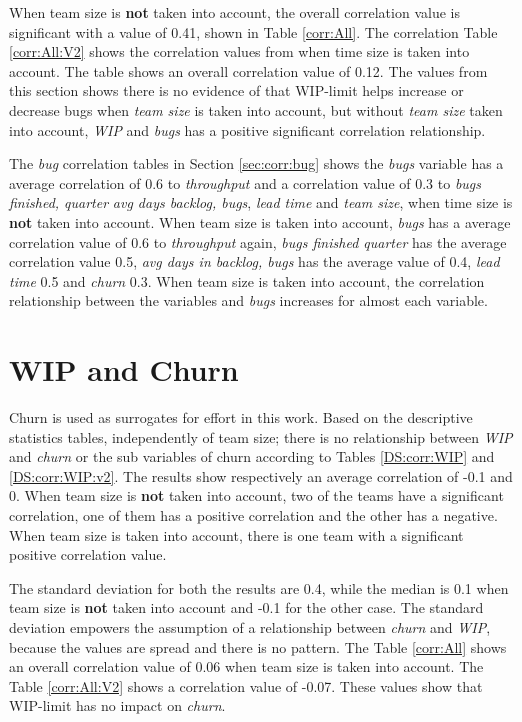 \documentclass[UKenglish]{ifimaster}  %
\begin{document}
When team size is \textbf{not} taken into account, the overall correlation value is significant with a value of  0.41, shown in Table \ref{corr:All}.  The correlation Table \ref{corr:All:V2} shows the correlation values from when time size is taken into account. The table shows an overall correlation value of 0.12. The values from this section shows there is no evidence of that WIP-limit helps increase or decrease bugs when \textit{team size} is taken into account, but without \textit{team size} taken into account, \textit{WIP} and \textit{bugs} has a positive significant correlation relationship.  


The \textit{bug} correlation tables in Section  \ref{sec:corr:bug} shows the \textit{bugs} variable has a average correlation of 0.6 to \textit{throughput} and a correlation value of 0.3 to \textit{bugs finished, quarter} \textit{avg days backlog, bugs}, \textit{lead time} and \textit{team size}, when time size is \textbf{not} taken into account. When team size is taken into account, \textit{bugs} has a average correlation value of 0.6 to \textit{throughput} again, \textit{bugs finished quarter} has the average correlation value 0.5, \textit{avg days in backlog, bugs} has the average value of 0.4, \textit{lead time} 0.5 and \textit{churn} 0.3. When team size is taken into account, the correlation relationship between the variables and \textit{bugs} increases for almost each variable.
 

\section{WIP and Churn}
Churn is used as surrogates for effort in this work. Based on the descriptive statistics tables, independently of  team size; there is no relationship between \textit{WIP} and \textit{churn} or the sub variables of churn according to Tables \ref{DS:corr:WIP} and \ref{DS:corr:WIP:v2}. The results show respectively an average correlation of -0.1 and 0. When team size is \textbf{not} taken into account, two of the teams have a significant correlation, one of them has a positive correlation and the other has a negative. When team size is taken into account, there is one team with a significant positive correlation value.

The standard deviation for both the results are 0.4, while the median is 0.1 when team size is \textbf{not} taken into account and -0.1 for the other case. The standard deviation empowers the assumption of a relationship between \textit{churn} and \textit{WIP}, because the values are spread and there is no pattern.  The Table \ref{corr:All} shows an overall correlation value of 0.06 when team size is taken into account. The Table \ref{corr:All:V2} shows a correlation value of -0.07. These values show that WIP-limit has no impact on \textit{churn}.
\end{document}
